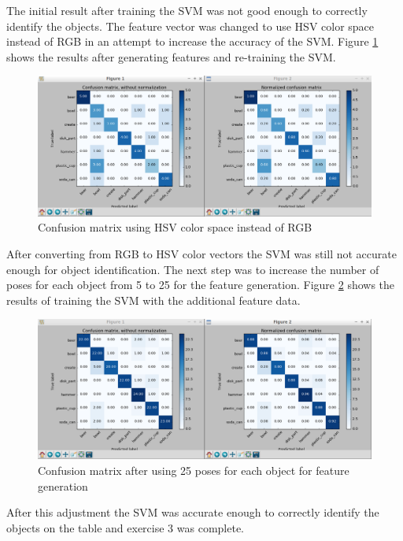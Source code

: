 \documentclass{article}
\begin{document}
The initial result after training the SVM was not good enough to correctly identify the objects. The feature vector was changed to use HSV color space instead of RGB in an attempt to increase the accuracy of the SVM. Figure \ref{fig:SVMHSV} shows the results after generating features and re-training the SVM.

\begin{figure}[H]
    \includegraphics[width=\linewidth]{ex3SVMHSV.png}
    \caption{Confusion matrix using HSV color space instead of RGB}
    \label{fig:SVMHSV}
\end{figure}

After converting from RGB to HSV color vectors the SVM was still not accurate enough for object identification. The next step was to increase the number of poses for each object from 5 to 25 for the feature generation. Figure \ref{fig:SVM25} shows the results of training the SVM with the additional feature data.

\begin{figure}[H]
    \includegraphics[width=\linewidth]{ex3SVM25.png}
    \caption{Confusion matrix after using 25 poses for each object for feature generation}
    \label{fig:SVM25}
\end{figure}

After this adjustment the SVM was accurate enough to correctly identify the objects on the table and exercise 3 was complete.
\end{document}

